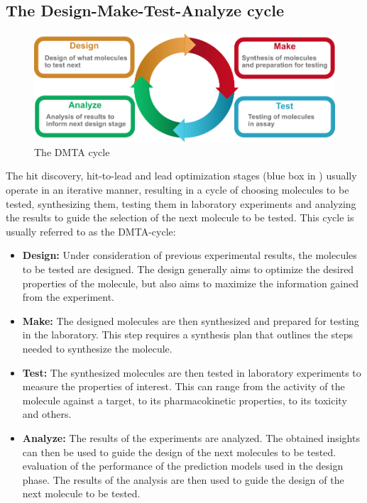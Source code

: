 \subsection{The Design-Make-Test-Analyze cycle}
\begin{figure}
    \centering
    \includegraphics[width=\textwidth]{figures/dmta_cycle.pdf}
    \caption{The DMTA cycle}
\end{figure}
The hit discovery, hit-to-lead and lead optimization stages (blue box in
) usually operate in an iterative manner, resulting in a cycle of
choosing molecules to be tested, synthesizing them, testing them in laboratory experiments and
analyzing the results to guide the selection of the next molecule to be tested. This cycle is
usually referred to as the \ac{DMTA}-cycle:
\begin{itemize}
    \item \textbf{Design:} Under consideration of previous experimental results, the molecules to
          be tested are designed. The design generally aims to optimize the desired properties of
          the molecule, but also aims to maximize the information gained from the experiment.
    \item \textbf{Make:} The designed molecules are then synthesized and prepared for testing in
          the laboratory. This step requires a synthesis plan that outlines the steps needed to
          synthesize the molecule.
    \item \textbf{Test:} The synthesized molecules are then tested in laboratory experiments to
          measure the properties of interest. This can range from the activity of the molecule
          against a target, to its pharmacokinetic properties, to its toxicity and others.
    \item \textbf{Analyze:} The results of the experiments are analyzed. The obtained insights
          can then be used to guide the design of the next molecules to be tested.
          evaluation of the performance of the prediction models used in the design phase. The
          results of the analysis are then used to guide the design of the next molecule to be
          tested.
\end{itemize}

